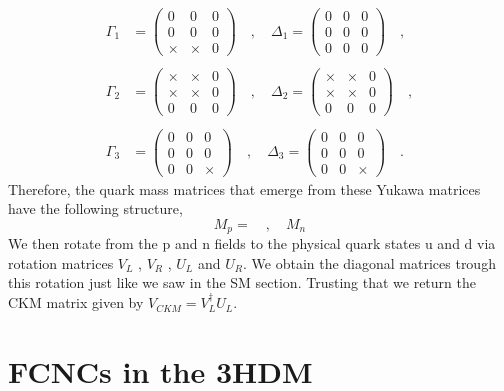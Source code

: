\begin{equation}
\begin{split}
\Gamma_1 & = \begin{pmatrix}
0 & 0 & 0\\
0 & 0 & 0\\
\times & \times & 0
\end{pmatrix}
\quad , \quad 
\Delta_1 = \begin{pmatrix}
0 & 0 & 0\\
0 & 0 & 0\\
0 & 0 & 0
\end{pmatrix} \quad , \\
& \\
\Gamma_2 & = \begin{pmatrix}
\times & \times & 0\\
\times & \times & 0\\
0 & 0 & 0
\end{pmatrix}
\quad , \quad 
\Delta_2 = \begin{pmatrix}
\times & \times & 0\\
\times & \times & 0\\
0 & 0 & 0
\end{pmatrix} \quad , \\ 
& \\ 
\Gamma_3 & = \begin{pmatrix}
0 & 0 & 0\\
0 & 0 & 0\\
0 & 0 & \times
\end{pmatrix}
\quad , \quad 
\Delta_3 = \begin{pmatrix}
0 & 0 & 0\\
0 & 0 & 0\\
0 & 0 & \times
\end{pmatrix} \quad . 
\end{split} 
\end{equation}
Therefore, the quark mass matrices that emerge from these Yukawa matrices have the following structure, 
\begin{equation}
M_p = \quad , \quad M_n
\end{equation}
We then rotate from the p and n fields to the physical quark states u and d via rotation matrices $V_L$ , $V_R$ , $U_L$ and $U_R$. We obtain the diagonal matrices trough this rotation just like we saw in the SM section. Trusting that we return the CKM matrix given by $V_{CKM}=V_L^\dagger U_L$.  

\section{FCNCs in the 3HDM}

